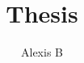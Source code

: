 \documentclass[11pt,a4paper,openany,onesided]{book}
\title{Thesis}
\author{Alexis B}
\date{}
\begin{document}
\maketitle{}
\mainmatter

\tableofcontents{}


\end{document}

